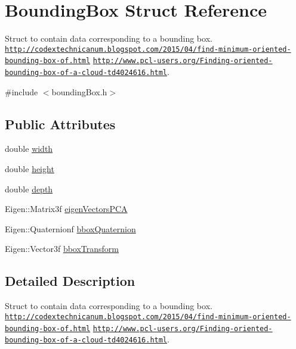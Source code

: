 \hypertarget{structBoundingBox}{\section{Bounding\-Box Struct Reference}
\label{structBoundingBox}
}


Struct to contain data corresponding to a bounding box. \href{http://codextechnicanum.blogspot.com/2015/04/find-minimum-oriented-bounding-box-of.html}{\tt http\-://codextechnicanum.\-blogspot.\-com/2015/04/find-\/minimum-\/oriented-\/bounding-\/box-\/of.\-html} \href{http://www.pcl-users.org/Finding-oriented-bounding-box-of-a-cloud-td4024616.html}{\tt http\-://www.\-pcl-\/users.\-org/\-Finding-\/oriented-\/bounding-\/box-\/of-\/a-\/cloud-\/td4024616.\-html}.  




{\ttfamily \#include $<$bounding\-Box.\-h$>$}

\subsection*{Public Attributes}
\begin{DoxyCompactItemize}
\item 
double \hyperlink{structBoundingBox_a47d7ff05e12cf3268a455ee7e11a92f3}{width}
\item 
double \hyperlink{structBoundingBox_ad8b207c019e3ee84f340fe749bcbedb4}{height}
\item 
double \hyperlink{structBoundingBox_ab8c3f78abef6754dbd5e4cc1a30a8c34}{depth}
\item 
Eigen\-::\-Matrix3f \hyperlink{structBoundingBox_ab55f4729c19bfba70ddabb37d3edacf9}{eigen\-Vectors\-P\-C\-A}
\item 
Eigen\-::\-Quaternionf \hyperlink{structBoundingBox_aa620a944c2b9b9bfa35dc60bae834656}{bbox\-Quaternion}
\item 
Eigen\-::\-Vector3f \hyperlink{structBoundingBox_a71142840ea760b550a09c465e38dd802}{bbox\-Transform}
\end{DoxyCompactItemize}


\subsection{Detailed Description}
Struct to contain data corresponding to a bounding box. \href{http://codextechnicanum.blogspot.com/2015/04/find-minimum-oriented-bounding-box-of.html}{\tt http\-://codextechnicanum.\-blogspot.\-com/2015/04/find-\/minimum-\/oriented-\/bounding-\/box-\/of.\-html} \href{http://www.pcl-users.org/Finding-oriented-bounding-box-of-a-cloud-td4024616.html}{\tt http\-://www.\-pcl-\/users.\-org/\-Finding-\/oriented-\/bounding-\/box-\/of-\/a-\/cloud-\/td4024616.\-html}. 

